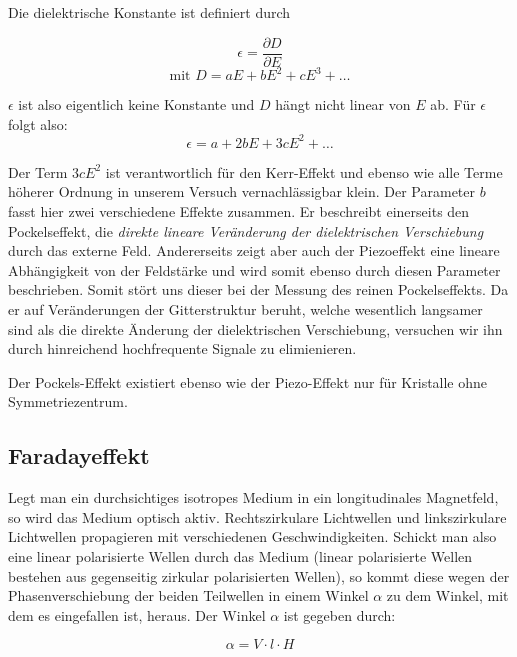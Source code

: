 Die dielektrische Konstante ist definiert durch 

\begin{equation} \epsilon = \frac{\partial D}{\partial E}  \end{equation}
\begin{equation} \text{mit \ } D = aE + bE^2 + cE^3 + \dots \end{equation}

$\epsilon$ ist also eigentlich keine Konstante und $D$ hängt nicht linear von $E$ ab. Für $\epsilon$ folgt also:
\begin{equation} \epsilon = a + 2bE + 3cE^2 + \dots \end{equation}

Der Term $3cE^2$ ist verantwortlich für den Kerr-Effekt und ebenso wie alle Terme höherer Ordnung in unserem Versuch vernachlässigbar klein. Der Parameter $b$ fasst hier zwei verschiedene Effekte zusammen. Er beschreibt einerseits den Pockelseffekt, die \emph{direkte lineare Veränderung der dielektrischen Verschiebung} durch das externe Feld. Andererseits zeigt aber auch der Piezoeffekt eine lineare Abhängigkeit von der Feldstärke und wird somit ebenso durch diesen Parameter beschrieben. Somit stört uns dieser bei der Messung des reinen Pockelseffekts. Da er auf Veränderungen der Gitterstruktur beruht, welche wesentlich langsamer sind als die direkte Änderung der dielektrischen Verschiebung, versuchen wir ihn durch hinreichend hochfrequente Signale zu elimienieren.

Der Pockels-Effekt existiert ebenso wie der Piezo-Effekt nur für Kristalle ohne Symmetriezentrum.



\subsection{Faradayeffekt}

Legt man ein durchsichtiges isotropes Medium in ein longitudinales Magnetfeld, so wird das Medium optisch aktiv. Rechtszirkulare Lichtwellen und linkszirkulare Lichtwellen propagieren mit verschiedenen Geschwindigkeiten. Schickt man also eine linear polarisierte Wellen durch das Medium (linear polarisierte Wellen bestehen aus gegenseitig zirkular polarisierten Wellen), so kommt diese wegen der Phasenverschiebung der beiden Teilwellen in einem Winkel $\alpha$ zu dem Winkel, mit dem es eingefallen ist, heraus. Der Winkel $\alpha$ ist gegeben durch:

\begin{equation} \alpha = V\cdot l \cdot H \end{equation}

